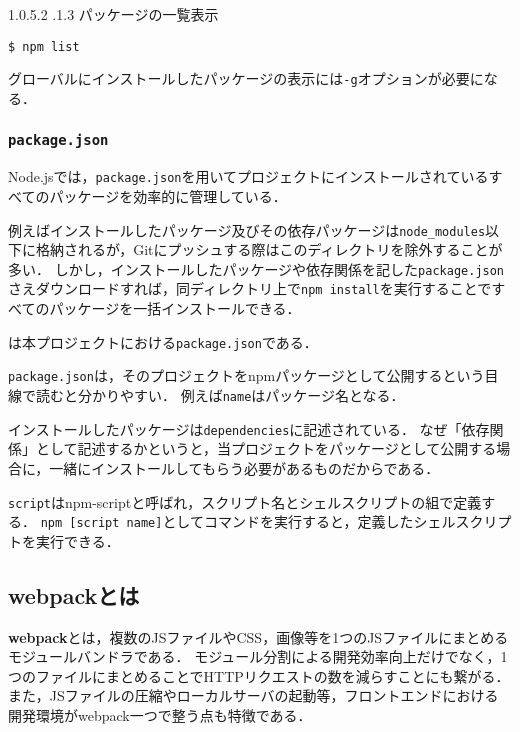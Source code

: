\documentclass[autodetect-engine,dvi=dvipdfmx,ja=standard,
               a4j,11pt]{bxjsarticle}
\makeatletter
\renewcommand{\paragraph}{\@startsection{paragraph}{4}{\z@}%
  {1.0\Cvs \@plus.5\Cdp \@minus.2\Cdp}%
  {.1\Cvs \@plus.3\Cdp}%
  {\reset@font\sffamily\normalsize}
}
\newcommand{\figref}[1]{\makebox{図~\ref{#1}}}
\makeatother
\begin{document}
\paragraph{パッケージの一覧表示}

\begin{Verbatim}[numbers=none, xleftmargin=8mm, numbersep=6pt, fontsize=\small, baselinestretch=0.8]
$ npm list
\end{Verbatim}
%
グローバルにインストールしたパッケージの表示には\verb|-g|オプションが必要になる．

\subsubsection{{\tt package.json}}

Node.jsでは，\verb|package.json|を用いてプロジェクトにインストールされているすべてのパッケージを効率的に管理している．

例えばインストールしたパッケージ及びその依存パッケージは\verb|node_modules|以下に格納されるが，Gitにプッシュする際はこのディレクトリを除外することが多い．
しかし，インストールしたパッケージや依存関係を記した\verb|package.json|さえダウンロードすれば，同ディレクトリ上で\verb|npm install|を実行することですべてのパッケージを一括インストールできる．

\figref{prog:package}は本プロジェクトにおける\verb|package.json|である．



\verb|package.json|は，そのプロジェクトをnpmパッケージとして公開するという目線で読むと分かりやすい．
例えば\verb|name|はパッケージ名となる．

インストールしたパッケージは\verb|dependencies|に記述されている．
なぜ「依存関係」として記述するかというと，当プロジェクトをパッケージとして公開する場合に，一緒にインストールしてもらう必要があるものだからである．

\verb|script|はnpm-scriptと呼ばれ，スクリプト名とシェルスクリプトの組で定義する．
\verb|npm [script name]|としてコマンドを実行すると，定義したシェルスクリプトを実行できる．

\subsection{webpackとは}

{\bf webpack}とは，複数のJSファイルやCSS，画像等を1つのJSファイルにまとめるモジュールバンドラである．
モジュール分割による開発効率向上だけでなく，1つのファイルにまとめることでHTTPリクエストの数を減らすことにも繋がる．
また，JSファイルの圧縮やローカルサーバの起動等，フロントエンドにおける開発環境がwebpack一つで整う点も特徴である．
\end{document}
